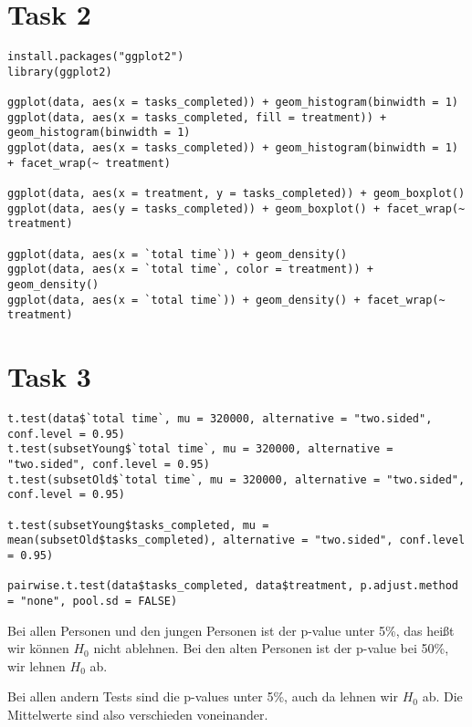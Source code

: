 \documentclass{article}
\begin{document}
	\section*{Task 2}
	\begin{lstlisting}
install.packages("ggplot2")
library(ggplot2)

ggplot(data, aes(x = tasks_completed)) + geom_histogram(binwidth = 1)
ggplot(data, aes(x = tasks_completed, fill = treatment)) + geom_histogram(binwidth = 1)
ggplot(data, aes(x = tasks_completed)) + geom_histogram(binwidth = 1) + facet_wrap(~ treatment)

ggplot(data, aes(x = treatment, y = tasks_completed)) + geom_boxplot()
ggplot(data, aes(y = tasks_completed)) + geom_boxplot() + facet_wrap(~ treatment)

ggplot(data, aes(x = `total time`)) + geom_density()
ggplot(data, aes(x = `total time`, color = treatment)) + geom_density()
ggplot(data, aes(x = `total time`)) + geom_density() + facet_wrap(~ treatment)
	\end{lstlisting}
	
	\section*{Task 3}
	\begin{lstlisting}
t.test(data$`total time`, mu = 320000, alternative = "two.sided", conf.level = 0.95)
t.test(subsetYoung$`total time`, mu = 320000, alternative = "two.sided", conf.level = 0.95)
t.test(subsetOld$`total time`, mu = 320000, alternative = "two.sided", conf.level = 0.95)

t.test(subsetYoung$tasks_completed, mu = mean(subsetOld$tasks_completed), alternative = "two.sided", conf.level = 0.95)

pairwise.t.test(data$tasks_completed, data$treatment, p.adjust.method = "none", pool.sd = FALSE)
	\end{lstlisting}
	Bei allen Personen und den jungen Personen ist der p-value unter 5\%, das heißt wir können $H_0$ nicht ablehnen. Bei den alten Personen ist der p-value bei 50\%, wir lehnen $H_0$ ab.
	
	Bei allen andern Tests sind die p-values unter 5\%, auch da lehnen wir $H_0$ ab. Die Mittelwerte sind also verschieden voneinander.
	
\end{document}
